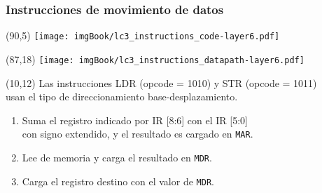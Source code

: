 \documentclass[aspectratio=169]{beamer}
\begin{document}
\begin{frame}[t,fragile]
    \frametitle{Instrucciones de movimiento de datos}
    \begin{textblock}{65}(90,5) \texttt{[image: imgBook/lc3\_instructions\_code-layer6.pdf]} \end{textblock}
    \begin{textblock}{65}(87,18) \texttt{[image: imgBook/lc3\_instructions\_datapath-layer6.pdf]} \end{textblock}
    \begin{textblock}{85}(10,12)
    \small
    Las instrucciones LDR (opcode = 1010) y STR (opcode = 1011)\\ usan el tipo de direccionamiento base-desplazamiento.\\
    \vspace{0.2cm}
    \begin{enumerate}
    \footnotesize
    \setlength\itemsep{0cm}
     \item<4-> Suma el registro indicado por IR [8:6] con el IR [5:0]\\ con signo extendido, y el resultado es cargado en \texttt{MAR}.
     \item<5-> Lee de memoria y carga el resultado en \texttt{MDR}.
     \item<6-> Carga el registro destino con el valor de \texttt{MDR}.
    \end{enumerate}
    \end{textblock}
\end{frame}
\end{document}
